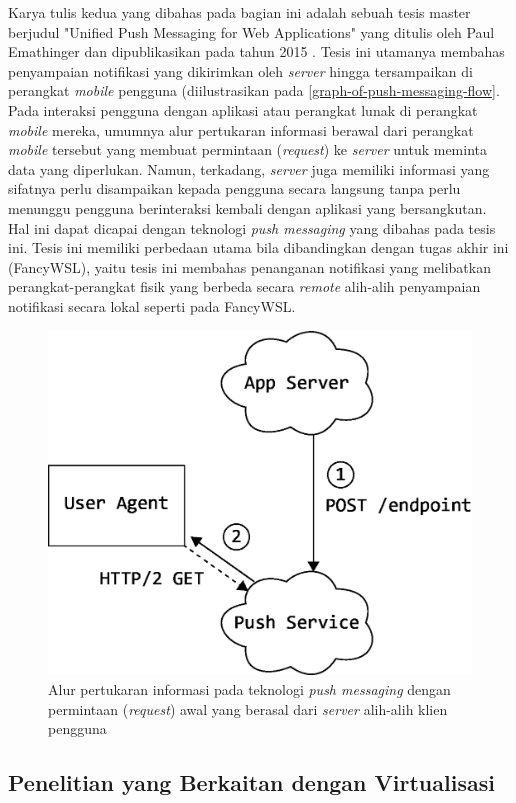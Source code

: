 Karya tulis kedua yang dibahas pada bagian ini adalah sebuah tesis master berjudul "Unified Push Messaging for Web Applications" yang ditulis oleh Paul Emathinger dan dipublikasikan pada tahun 2015 \cite{emathinger2015unified}. Tesis ini utamanya membahas penyampaian notifikasi yang dikirimkan oleh \textit{server} hingga tersampaikan di perangkat \textit{mobile} pengguna (diilustrasikan pada \autoref{graph-of-push-messaging-flow}. Pada interaksi pengguna dengan aplikasi atau perangkat lunak di perangkat \textit{mobile} mereka, umumnya alur pertukaran informasi berawal dari perangkat \textit{mobile} tersebut yang membuat permintaan (\textit{request}) ke \textit{server} untuk meminta data yang diperlukan. Namun, terkadang, \textit{server} juga memiliki informasi yang sifatnya perlu disampaikan kepada pengguna secara langsung tanpa perlu menunggu pengguna berinteraksi kembali dengan aplikasi yang bersangkutan. Hal ini dapat dicapai dengan teknologi \textit{push messaging} yang dibahas pada tesis ini. Tesis ini memiliki perbedaan utama bila dibandingkan dengan tugas akhir ini (FancyWSL), yaitu tesis ini membahas penanganan notifikasi yang melibatkan perangkat-perangkat fisik yang berbeda secara \textit{remote} alih-alih penyampaian notifikasi secara lokal seperti pada FancyWSL.

\begin{figure}
    \centering
    \includegraphics[width=0.5\linewidth]{assets/Emathinger15-extracted-images-006.png}
    \caption{Alur pertukaran informasi pada teknologi \textit{push messaging} dengan permintaan (\textit{request}) awal yang berasal dari \textit{server} alih-alih klien pengguna \cite{emathinger2015unified}}
    \label{graph-of-push-messaging-flow}
\end{figure}

\subsection{Penelitian yang Berkaitan dengan Virtualisasi}

